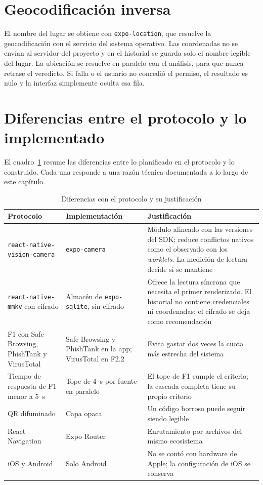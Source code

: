\section{Geocodificación inversa}

El nombre del lugar se obtiene con \texttt{expo-location}, que resuelve la geocodificación con el servicio del sistema operativo. Las coordenadas no se envían al servidor del proyecto y en el historial se guarda solo el nombre legible del lugar. La ubicación se resuelve en paralelo con el análisis, para que nunca retrase el veredicto. Si falla o el usuario no concedió el permiso, el resultado es nulo y la interfaz simplemente oculta esa fila.

\section{Diferencias entre el protocolo y lo implementado}

El cuadro~\ref{tab:divergencias} resume las diferencias entre lo planificado en el protocolo y lo construido. Cada una responde a una razón técnica documentada a lo largo de este capítulo.

\begin{table}[H]
	\centering
	\caption{Diferencias con el protocolo y su justificación}
	\label{tab:divergencias}
	\small
	\begin{tabular}{@{}>{\raggedright\arraybackslash}p{3.4cm}>{\raggedright\arraybackslash}p{3.2cm}>{\raggedright\arraybackslash}p{6.2cm}@{}}
		\toprule
		\textbf{Protocolo} & \textbf{Implementación} & \textbf{Justificación} \\
		\midrule
		\texttt{react-native-}\allowbreak\texttt{vision-camera} & \texttt{expo-camera} & Módulo alineado con las versiones del SDK; reduce conflictos nativos como el observado con los \emph{worklets}. La medición de lectura decide si se mantiene \\
		\texttt{react-native-mmkv} con cifrado & Almacén de \texttt{expo-sqlite}, sin cifrado & Ofrece la lectura síncrona que necesita el primer renderizado. El historial no contiene credenciales ni coordenadas; el cifrado se deja como recomendación \\
		F1 con Safe Browsing, PhishTank y VirusTotal & Safe Browsing y PhishTank en la app; VirusTotal en F2.2 & Evita gastar dos veces la cuota más estrecha del sistema \\
		Tiempo de respuesta de F1 menor a 5~s & Tope de 4~s por fuente en paralelo & El tope de F1 cumple el criterio; la cascada completa tiene su propio criterio \\
		QR difuminado & Capa opaca & Un código borroso puede seguir siendo legible \\
		React Navigation & Expo Router & Enrutamiento por archivos del mismo ecosistema \\
		iOS y Android & Solo Android & No se contó con hardware de Apple; la configuración de iOS se conserva \\
		\bottomrule
	\end{tabular}
\end{table}
